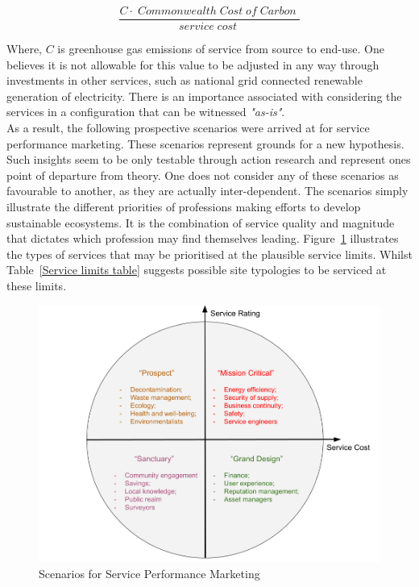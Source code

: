 \documentclass[11pt, oneside]{article}   	%
\begin{document}
\begin{equation}
	\frac{C  \cdot \;Commonwealth\; Cost\; of\; Carbon\;}{service\; cost\;}
\end{equation}

Where, $C$ is greenhouse gas emissions of service from source to end-use.
One believes it is not allowable for this value to be adjusted in any way through investments in other services, such as national grid connected renewable generation of electricity.
There is an importance associated with considering the services in a configuration that can be witnessed \emph{"as-is"}.\\

As a result, the following prospective scenarios were arrived at for service performance marketing.
These scenarios represent grounds for a new hypothesis.
Such insights seem to be only testable through action research and represent ones point of departure from theory.
One does not consider any of these scenarios as favourable to another, as they are actually inter-dependent.
The scenarios simply illustrate the different priorities of professions making efforts to develop sustainable ecosystems.
It is the combination of service quality and magnitude that dictates which profession may find themselves leading.
Figure~\ref{Scenarios} illustrates the types of services that may be prioritised at the plausible service limits.
Whilst Table~\ref{Service limits table} suggests possible site typologies to be serviced at these limits.\\

\begin{figure}[H]
\centering
\includegraphics[width=1\textwidth]{scenarios}
\caption{Scenarios for Service Performance Marketing}
\label{Scenarios}
\end{figure}
\end{document}
